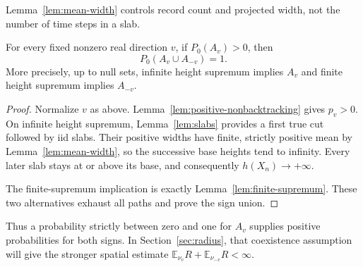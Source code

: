 Lemma~\ref{lem:mean-width} controls record count and projected width, not the number of
time steps in a slab.

\begin{lemma}\label{lem:sign-union}
For every fixed nonzero real direction $v$, if $P_0(A_v)>0$, then
\[
 P_0(A_v\cup A_{-v})=1.
\]
More precisely, up to null sets, infinite height supremum implies $A_v$
and finite height supremum implies $A_{-v}$.
\end{lemma}

\begin{proof}
Normalize $v$ as above.  Lemma~\ref{lem:positive-nonbacktracking} gives
$p_v>0$.  On infinite height supremum, Lemma~\ref{lem:slabs} provides a
first true cut followed by iid slabs.  Their positive widths have finite,
strictly positive mean by Lemma~\ref{lem:mean-width}, so the successive
base heights tend to infinity.  Every later slab stays at or above its
base, and consequently $h(X_n)\to+\infty$.

The finite-supremum implication is exactly
Lemma~\ref{lem:finite-supremum}.  These two alternatives exhaust
all paths and prove the sign union.
\end{proof}

Thus a probability strictly between zero and one for $A_v$ supplies
positive probabilities for both signs.  In Section~\ref{sec:radius}, that
coexistence assumption will give the stronger spatial estimate
$\mathbb E_{\nu_v}R+\mathbb E_{\nu_{-v}}R<\infty$.
